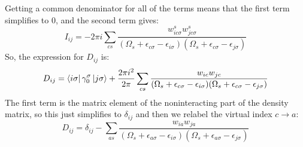 \documentclass[12pt]{caltech_thesis}
\begin{document}
Getting a common denominator for all of the terms means that the first term simplifies to 0, and the second term gives:
\begin{equation}
I_{ij} = -2\pi i \sum_{cs}\frac{w_{i c \sigma}^s w_{j c \sigma}^s}{(\Omega_s + \epsilon_{c \sigma} - \epsilon_{i \sigma})(\Omega_s + \epsilon_{c \sigma} - \epsilon_{j \sigma})}
\end{equation}
So, the expression for $D_{ij}$ is:
\begin{equation}
D_{ij} = \bra{i\sigma } \gamma _0^\sigma \ket{j\sigma } + \frac{2\pi i^2}{2\pi} \sum_{cs}\frac{w_{ic} w_{jc}}{(\Omega_s + \epsilon_{c \sigma} - \epsilon_{i \sigma})(\Omega_s + \epsilon_{c \sigma} - \epsilon_{j \sigma})}
\end{equation}
The first term is the matrix element of the noninteracting part of the density matrix, so this just simplifies to $\delta _{ij}$ and then we relabel the virtual index $c\rightarrow a$:
\begin{equation}
D_{ij} = \delta _{ij} - \sum_{as}\frac{w_{ia} w_{ja}}{(\Omega_s + \epsilon_{a \sigma} - \epsilon_{i \sigma})(\Omega_s + \epsilon_{a \sigma} - \epsilon_{j \sigma})}
\end{equation}
\end{document}
